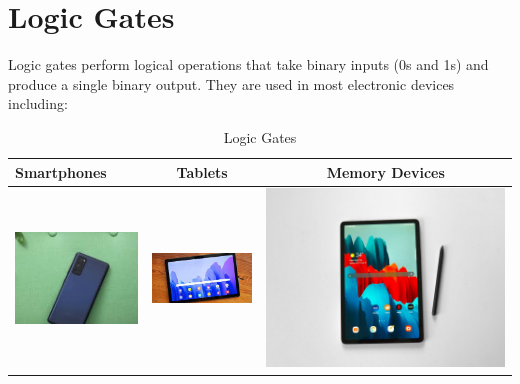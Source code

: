 \documentclass{article}
\begin{document}
	
\section{Logic Gates}
	Logic gates perform logical operations that take binary inputs (0s and 1s) and produce a single binary output. They are used in most electronic devices including:
\begin{table}[h!]
	\begin{center}
		\caption{Logic Gates}
		\label{tab:table1}
		\begin{tabular}{|l|c|c|}
			\hline
			Smartphones
			&
			Tablets
			&
			Memory Devices
			\\
			\hline
			\includegraphics[width=0.2\linewidth]{Samsung1}
			&
			\includegraphics[width=0.25\linewidth]{Galaxy Tab A7}
			&
			\includegraphics[width=0.25\linewidth]{Picture4} 
			\\
		   	  \hline
			
		\end{tabular}
	\end{center}
\end{table}
\end{document}
